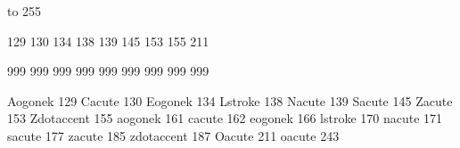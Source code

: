 


\startmapping[pl0]

 to 255

 129 %
 130 %
 134 %
 138 %
 139 %
 145 %
 153 %
 155 %
 211 %



\stopmapping

\startmapping[pl0]

 999  %
 999  %
 999  %
 999  %
 999  %
 999  %
 999  %
 999  %
 999  %

\stopmapping

\startencoding[pl0][pl0]

 Aogonek    129
 Cacute     130
 Eogonek    134
 Lstroke    138
 Nacute     139
 Sacute     145
 Zacute     153
 Zdotaccent 155
 aogonek    161
 cacute     162
 eogonek    166
 lstroke    170
 nacute     171
 sacute     177
 zacute     185
 zdotaccent 187
 Oacute     211
 oacute     243

